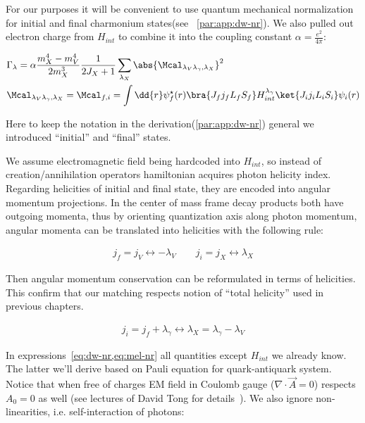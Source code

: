 For our purposes it will be convenient to use quantum mechanical normalization for initial and final charmonium states(see ~\cref{par:app:dw-nr}). We also pulled out electron charge from $H_{int}$ to combine it into the coupling constant $\alpha = \frac{e^2}{4 \pi}$: 

\begin{align}
    &\Gamma_{\lambda} = \alpha \frac{m_X^4 - m_V^4}{2 m_X^3} \frac{1}{2J_X + 1} \sum_{\lambda_X} \abs{\Mcal_{\lambda_V \lambda_\gamma, \lambda_X}}^2 \label{eq:dw-nr} \\
    &\Mcal_{ \lambda_V \lambda_\gamma, \lambda_X } = \Mcal_{f, i} =  \int \dd{r} \psi_f^\star(r) \bra{J_f j_f L_f S_f} H_{int}^{\lambda_\gamma} \ket{J_i j_i L_i S_i} \psi_i(r) \label{eq:mel-nr}
\end{align}

Here to keep the notation in the derivation(\cref{par:app:dw-nr}) general we introduced ``initial'' and ``final'' states.

We assume electromagnetic field being hardcoded into $H_{int}$, so instead of creation/annihilation operators hamiltonian acquires photon helicity index. Regarding helicities of initial and final state, they are encoded into angular momentum projections.  In the center of mass frame decay products both have outgoing momenta, thus by orienting quantization axis along photon momentum, angular momenta can be translated into helicities with the following rule:

\begin{align}
    j_f = j_V \leftrightarrow -\lambda_V \qquad j_i = j_X \leftrightarrow \lambda_X
\end{align}

Then angular momentum conservation can be reformulated in terms of helicities. This confirm that our matching respects notion of ``total helicity'' used in previous chapters.

\begin{align}
    j_i = j_f + \lambda_\gamma \leftrightarrow \lambda_X = \lambda_\gamma - \lambda_V
\end{align}

In expressions~\cref{eq:dw-nr,eq:mel-nr} all quantities except $H_{int}$ we already know. The latter we'll derive based on Pauli equation for quark-antiquark system. Notice that when free of charges EM field in Coulomb gauge ($\nabla\cdot\vec{A} = 0$) respects $A_0 = 0$ as well (see lectures of David Tong for details~\cite{tong-qed}). We also ignore non-linearities, i.e. self-interaction of photons:

